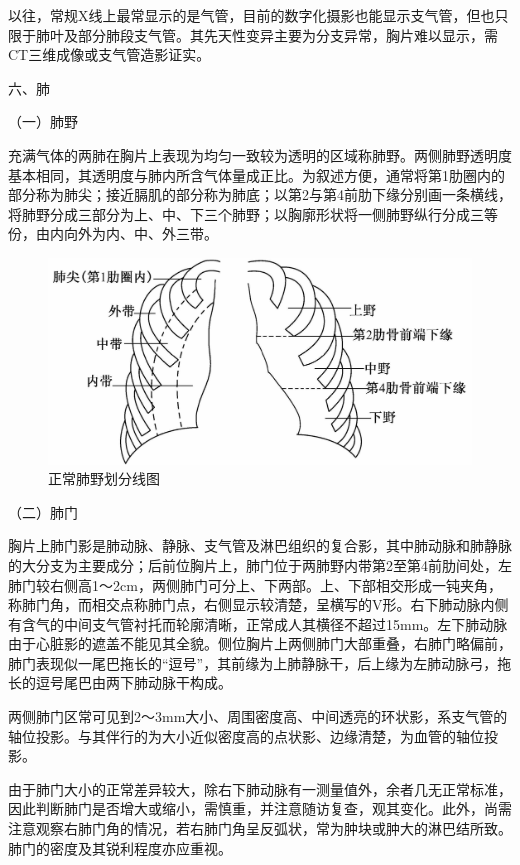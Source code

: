以往，常规X线上最常显示的是气管，目前的数字化摄影也能显示支气管，但也只限于肺叶及部分肺段支气管。其先天性变异主要为分支异常，胸片难以显示，需CT三维成像或支气管造影证实。

六、肺

（一）肺野

充满气体的两肺在胸片上表现为均匀一致较为透明的区域称肺野。两侧肺野透明度基本相同，其透明度与肺内所含气体量成正比。为叙述方便，通常将第1肋圈内的部分称为肺尖；接近膈肌的部分称为肺底；以第2与第4前肋下缘分别画一条横线，将肺野分成三部分为上、中、下三个肺野；以胸廓形状将一侧肺野纵行分成三等份，由内向外为内、中、外三带。

\begin{figure}[!htbp]
 \centering
 \includegraphics{./images/Image00136.jpg}
 \captionsetup{justification=centering}
 \caption{正常肺野划分线图}
 \label{fig3-1-7}
  \end{figure} 

（二）肺门

胸片上肺门影是肺动脉、静脉、支气管及淋巴组织的复合影，其中肺动脉和肺静脉的大分支为主要成分；后前位胸片上，肺门位于两肺野内带第2至第4前肋间处，左肺门较右侧高1～2cm，两侧肺门可分上、下两部。上、下部相交形成一钝夹角，称肺门角，而相交点称肺门点，右侧显示较清楚，呈横写的V形。右下肺动脉内侧有含气的中间支气管衬托而轮廓清晰，正常成人其横径不超过15mm。左下肺动脉由于心脏影的遮盖不能见其全貌。侧位胸片上两侧肺门大部重叠，右肺门略偏前，肺门表现似一尾巴拖长的“逗号”，其前缘为上肺静脉干，后上缘为左肺动脉弓，拖长的逗号尾巴由两下肺动脉干构成。

两侧肺门区常可见到2～3mm大小、周围密度高、中间透亮的环状影，系支气管的轴位投影。与其伴行的为大小近似密度高的点状影、边缘清楚，为血管的轴位投影。

由于肺门大小的正常差异较大，除右下肺动脉有一测量值外，余者几无正常标准，因此判断肺门是否增大或缩小，需慎重，并注意随访复查，观其变化。此外，尚需注意观察右肺门角的情况，若右肺门角呈反弧状，常为肿块或肿大的淋巴结所致。肺门的密度及其锐利程度亦应重视。

